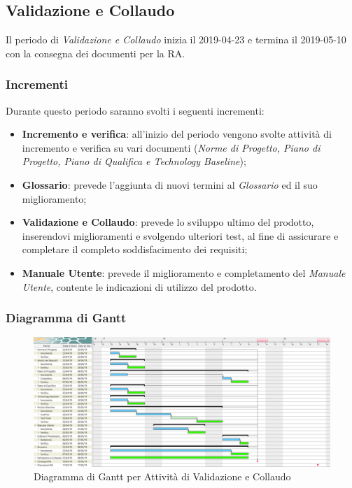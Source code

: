 \newpage
\subsection{Validazione e Collaudo}
\label{VEC}
Il periodo di \textit{Validazione e Collaudo} inizia il 2019-04-23 e termina il 2019-05-10 con la consegna dei documenti per la RA. 

\subsubsection{Incrementi}
Durante questo periodo saranno svolti i seguenti incrementi:
\begin{itemize}
	\item \textbf{Incremento e verifica}: all'inizio del periodo vengono svolte attività di incremento e verifica su vari documenti (\textit{Norme di Progetto, Piano di Progetto, Piano di Qualifica e Technology Baseline});
	\item \textbf{Glossario}: prevede l'aggiunta di nuovi termini al \textit{Glossario} ed il suo miglioramento;
	\item \textbf{Validazione e Collaudo}: prevede lo sviluppo ultimo del prodotto, inserendovi miglioramenti e svolgendo ulteriori test, al fine di assicurare e completare il completo soddisfacimento dei requisiti;
	\item \textbf{Manuale Utente}: prevede il miglioramento e completamento del \textit{Manuale Utente}, contente le indicazioni di utilizzo del prodotto.
\end{itemize}

\begin{landscape}
\subsubsection{Diagramma di Gantt}
\begin{figure}[H]
	\centering
  		\includegraphics[width=1.0\linewidth]{./images/ValidazioneeCollaudo.png}
  		\caption{Diagramma di Gantt per Attività di Validazione e Collaudo}
  		\label{fig:Gantt Validazione e Collaudo}
\end{figure}
\end{landscape}